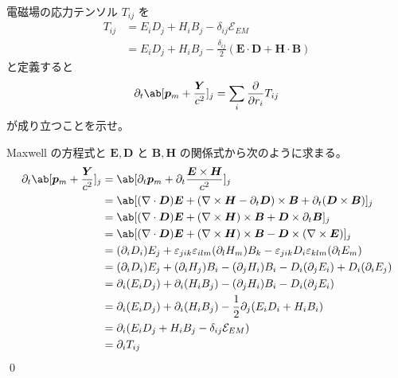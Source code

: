 \documentclass[uplatex,dvipdfmx,a4paper,11pt]{jlreq}
\makeatletter
\newcommand{\EE}{\bm{E}}
\newcommand{\DD}{\bm{D}}
\newcommand{\BB}{\bm{B}}
\newcommand{\HH}{\bm{H}}
\newcommand{\pp}{\bm{p}}
\newcommand{\vnabla}{\mathbf{\nabla}}
\theoremstyle{definition}
\renewenvironment{proof}[1][\proofname]{\par
  \normalfont
  \topsep6\p@\@plus6\p@ \trivlist
  \item[\hskip\labelsep{\bfseries #1}\@addpunct{\bfseries}]\ignorespaces\quad\par
}{%
  \qed\endtrivlist\@endpefalse
}
\renewcommand\proofname{証明}
\makeatother
\begin{document}
\begin{problem}
電磁場の応力テンソル $T_{ij}$ を
\begin{align}
  T_{ij} & = E_iD_j + H_iB_j - \delta_{ij}\mathcal{E}_{EM}                      \\
         & = E_iD_j + H_iB_j - \frac{\delta_{ij}}{2}(\EE\cdot\DD + \HH\cdot\BB)
\end{align}
と定義すると
\begin{align}
  \partial_t\ab[\pp_m + \frac{\bm{Y}}{c^2}]_j = \sum_{i}\diffp{}{r_i}T_{ij}
\end{align}
が成り立つことを示せ。
\end{problem}
\begin{proof}
  Maxwell の方程式と $\EE, \DD$ と $\BB, \HH$ の関係式から次のように求まる。
  \begin{align}
    \partial_t\ab[\pp_m + \frac{\bm{Y}}{c^2}]_j & = \ab[\partial_t\pp_m + \partial_t\frac{\EE\times\HH}{c^2}]_j                                                                      \\
                                                & = \ab[(\vnabla\cdot\DD)\EE + (\vnabla\times\HH - \partial_t\DD)\times\BB + \partial_t(\DD\times\BB)]_j                             \\
                                                & = \ab[(\vnabla\cdot\DD)\EE + (\vnabla\times\HH)\times\BB + \DD\times\partial_t\BB]_j                                               \\
                                                & = \ab[(\vnabla\cdot\DD)\EE + (\vnabla\times\HH)\times\BB - \DD\times(\vnabla\times\EE)]_j                                          \\
                                                & = (\partial_iD_i)E_j + \varepsilon_{jik}\varepsilon_{ilm}(\partial_lH_m)B_k - \varepsilon_{jik}D_i\varepsilon_{klm}(\partial_lE_m) \\
                                                & = (\partial_iD_i)E_j + (\partial_iH_j)B_i - (\partial_jH_i)B_i - D_i(\partial_jE_i) + D_i(\partial_iE_j)                           \\
                                                & = \partial_i(E_iD_j) + \partial_i(H_iB_j) - (\partial_jH_i)B_i - D_i(\partial_jE_i)                                                \\
                                                & = \partial_i(E_iD_j) + \partial_i(H_iB_j) - \frac{1}{2}\partial_j(E_iD_i + H_iB_i)                                                 \\
                                                & = \partial_i(E_iD_j + H_iB_j - \delta_{ij}\mathcal{E}_{EM})                                                                        \\
                                                & = \partial_iT_{ij}
  \end{align}
\end{proof}
\end{document}
